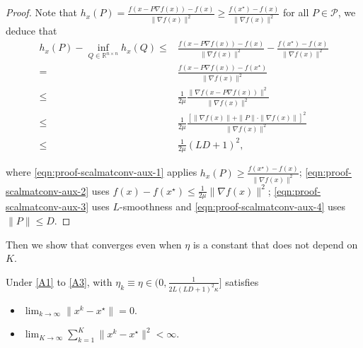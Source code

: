 \begin{proof}
  Note that $h_x (P) = \tfrac{f (x - P \nabla f (x)) - f (x)}{\| \nabla f (x)
  \|^2} \geq \tfrac{f (x^{\star}) - f (x)}{\| \nabla f (x) \|^2}$ for all $P
  \in \mathcal{P}$, we deduce that
  \begin{align}
    h_x (P) - \inf_{Q \in \mathbb{R}^{n \times n}} h_x (Q) \leq{} & \tfrac{f (x
    - P \nabla f (x)) - f (x)}{\| \nabla f (x) \|^2} - \tfrac{f (x^{\star}) -
    f (x)}{\| \nabla f (x) \|^2} \label{eqn:proof-scalmatconv-aux-1}\\
    ={} & \tfrac{f (x - P \nabla f (x)) - f (x^{\star})}{\| \nabla f (x) \|^2}
    \nonumber\\
    \leq{} & \tfrac{1}{2 \mu} \tfrac{\| \nabla f (x - P \nabla f (x)) \|^2}{\|
    \nabla f (x) \|^2} \label{eqn:proof-scalmatconv-aux-2} \\
    \leq{} & \tfrac{1}{2 \mu} \tfrac{[\| \nabla f (x) \| + \| P \| \cdot \|
    \nabla f (x) \|]^2}{\| \nabla f (x) \|^2} \label{eqn:proof-scalmatconv-aux-3} \\
    \leq{} & \tfrac{1}{2 \mu} (L D + 1)^2,  \label{eqn:proof-scalmatconv-aux-4}
  \end{align}
  
where \eqref{eqn:proof-scalmatconv-aux-1} applies $h_x(P) \geq \tfrac{f (x^{\star}) - f (x)}{\| \nabla f (x) \|^2}$; \eqref{eqn:proof-scalmatconv-aux-2} uses $f(x) - f(x^\star) \leq \frac{1}{2\mu} \|\nabla f(x)\|^2$; \eqref{eqn:proof-scalmatconv-aux-3} uses $L$-smoothness and \eqref{eqn:proof-scalmatconv-aux-4} uses $\|P\| \leq D$. 
\end{proof}

Then we show that {\hdm} converges even when $\eta$ is a constant that does not depend on $K$. 

\begin{lem} \label{lem:scal-mat-conv-aux-2} Under \ref{A1} to \ref{A3},  with $\eta_k \equiv \eta \in (0, \frac{1}{2 L (L D + 1)^2 \kappa}]$ satisfies
  \begin{itemize}[leftmargin=15pt]
    \item $\lim_{k \rightarrow \infty} \| x^k - x^{\star} \| = 0$. 
    
    \item $\lim_{K \rightarrow \infty} \sum_{k = 1}^K \| x^k - x^{\star} \|^2
    < \infty$.
  \end{itemize}
\end{lem}

